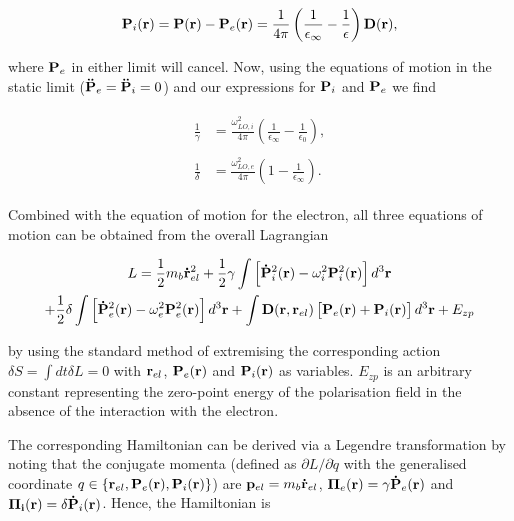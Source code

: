 \begin{equation}
    \vb{P}_i(\vb{r}) = \vb{P}(\vb{r}) - \vb{P}_e(\vb{r}) = \frac{1}{4\pi} \left(\frac{1}{\epsilon_\infty} - \frac{1}{\epsilon} \right) \vb{D}(\vb{r}),
\end{equation}

where $\vb{P}_e$ in either limit will cancel. Now, using the equations of motion in the static limit ($\vb{\ddot{P}}_{e} = \vb{\ddot{P}}_{i} = 0$) and our expressions for $\vb{P}_i$ and $\vb{P}_e$ we find

\begin{subequations}
\begin{align}
    \begin{split}
        \frac{1}{\gamma} &= \frac{\omega_{LO, i}^2}{4\pi} \left(\frac{1}{\epsilon_\infty} - \frac{1}{\epsilon_0} \right),
    \end{split}\\
    \begin{split}
        \frac{1}{\delta} &= \frac{\omega_{LO, e}^2}{4\pi} \left(1 - \frac{1}{\epsilon_\infty} \right).
    \end{split}
\end{align}
\end{subequations}

Combined with the equation of motion for the electron, all three equations of motion can be obtained from the overall Lagrangian

\begin{equation}
\begin{gathered}
    L = \frac{1}{2} m_b \vb{\dot{r}}_{el}^2 + \frac{1}{2} \gamma \int \left[ \vb{\dot{P}}_{i}^2(\vb{r}) - \omega_i^2 \vb{P}^2_i (\vb{r}) \right] d^3 \vb{r} \\
    + \frac{1}{2} \delta \int \left[ \vb{\dot{P}}_{e}^2(\vb{r}) - \omega_e^2 \vb{P}^2_e (\vb{r}) \right] d^3 \vb{r} + \int \vb{D}(\vb{r}, \vb{r}_{el})\left[\vb{P}_e(\vb{r})+\vb{P}_i(\vb{r})\right] d^3\vb{r} + E_{zp}
\end{gathered}
\end{equation}

by using the standard method of extremising the corresponding action $\delta S = \int dt \delta L = 0$ with $\vb{r}_{el}$, $\vb{P}_e(\vb{r})$ and $\vb{P}_i(\vb{r})$ as variables. $E_{zp}$ is an arbitrary constant representing the zero-point energy of the polarisation field in the absence of the interaction with the electron. 

The corresponding Hamiltonian can be derived via a Legendre transformation by noting that the conjugate momenta (defined as $\partial L/\partial\dot{q}$ with the generalised coordinate $q \in \{\vb{r}_{el},  \vb{P}_e(\vb{r}), \vb{P}_i(\vb{r})\}$) are $\vb{p}_{el} = m_b \vb{\dot{r}}_{el}$, $\vb{\Pi}_e(\vb{r}) = \gamma \vb{\dot{P}}_e(\vb{r})$ and $\vb{\Pi_i(\vb{r})} = \delta \vb{\dot{P}}_i (\vb{r})$. Hence, the Hamiltonian is

